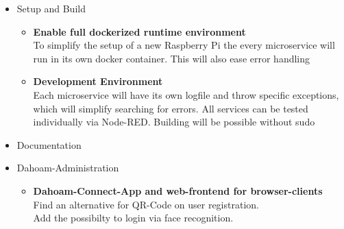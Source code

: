 \documentclass[12pt]{article}
\theoremstyle{definition}
\begin{document}
\begin{itemize}
    \item Setup and Build
    \begin{itemize}
        \item \textbf{Enable full dockerized runtime environment} \\
         To simplify the setup of a new Raspberry Pi the every microservice will run in its own docker container. This will also ease error handling
        \item \textbf{Development Environment} \\
        Each microservice will have its own logfile and throw specific exceptions, which will simplify searching for errors.
        All services can be tested individually via Node-RED.
        Building will be possible without sudo
    \end{itemize}
    \item Documentation
    \item Dahoam-Administration
    \begin{itemize}
        \item \textbf{Dahoam-Connect-App and web-frontend for browser-clients} \\
        Find an alternative for QR-Code on user registration. \\
        Add the possibilty to login via face recognition.
        

\end{itemize}
\end{itemize}
\end{document}
